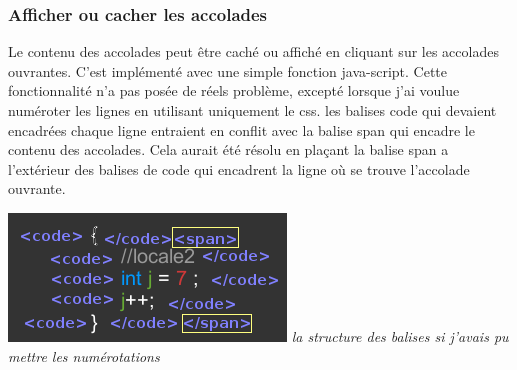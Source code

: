 \documentclass[10pt,a4paper]{report}
\begin{document}
\subsubsection*{Afficher ou cacher les accolades}
Le contenu des accolades peut être caché ou affiché en cliquant sur les accolades ouvrantes. \newline
C'est implémenté avec une simple fonction java-script. \newline
Cette fonctionnalité n'a pas posée de réels problème, excepté lorsque j'ai voulue numéroter les lignes en utilisant uniquement le css. les balises code qui devaient encadrées chaque ligne entraient en conflit avec la balise span qui encadre le contenu des accolades. Cela aurait été résolu en plaçant la balise span a l'extérieur des balises de code qui encadrent la ligne où se trouve l'accolade ouvrante.

\includegraphics{site/numerote.png} 
\textit{la structure des balises si j'avais pu mettre les numérotations}
\end{document}
